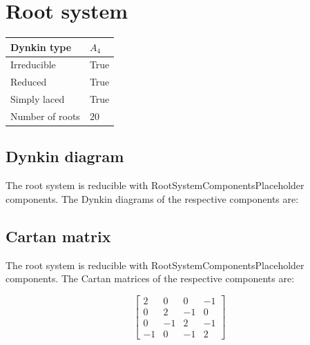 \documentclass[11pt]{article}
\theoremstyle{definition}
\newif\ifrootsystemirreducible
\begin{document}
\newpage
\section{Root system}

\begin{tabular}{|l|l|}
	\hline
    Dynkin type & $A_4$ \\
	\hline
    Irreducible & True \\
	\hline
    Reduced & True \\
	\hline
	Simply laced & True \\
	\hline
	Number of roots & $20$ \\
	\hline
\end{tabular}

\subsection{Dynkin diagram}

\ifrootsystemirreducible
The root system is irreducible and has Dynkin diagram:
\else
The root system is reducible with RootSystemComponentsPlaceholder components. The Dynkin diagrams of the respective components are:
\fi


\subsection{Cartan matrix}

\ifrootsystemirreducible
The root system is irreducible and has Cartan matrix:
\else
The root system is reducible with RootSystemComponentsPlaceholder components. The Cartan matrices of the respective components are:
\fi

\[
\left[\begin{matrix}2 & 0 & 0 & -1\\0 & 2 & -1 & 0\\0 & -1 & 2 & -1\\-1 & 0 & -1 & 2\end{matrix}\right]
\]
\end{document}
